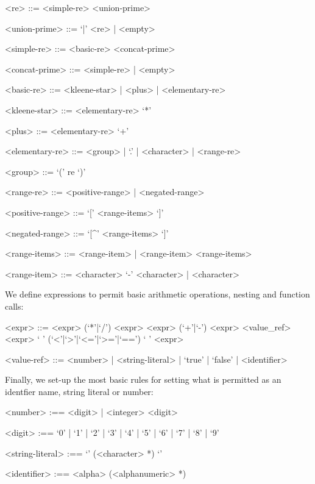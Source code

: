 \documentclass[a4paper,openany,12pt]{book}
\begin{document}
\begin{grammar}

    <re> ::= <simple-re> <union-prime>

    <union-prime> ::= `|' <re> | <empty>

    <simple-re> ::= <basic-re> <concat-prime>

    <concat-prime> ::= <simple-re> | <empty>

    <basic-re> ::= <kleene-star> | <plus> | <elementary-re>

    <kleene-star> ::= <elementary-re> `*'

    <plus> ::= <elementary-re> `+'

    <elementary-re> ::= <group> | `.' | <character> | <range-re>

    <group> ::= `(' re `)'

    <range-re> ::= <positive-range> | <negated-range>

    <positive-range> ::= `[' <range-items> `]'

    <negated-range> ::= `[^' <range-items> `]'

    <range-items> ::= <range-item> | <range-item> <range-items>

    <range-item> ::= <character> `-' <character> | <character>

\end{grammar}

We define expressions to permit basic arithmetic operations, nesting and function calls:

\begin{grammar}
<expr> ::= <expr> (`*'|`/') <expr>
    \alt <expr> (`+'|`-') <expr>
    \alt <value_ref>
    \alt <expr> ` ' (`<'|`>'|`<='|`>='|`==') ` ' <expr>

<value-ref> ::= <number> | <string-literal> | `true' | `false' | <identifier>
\end{grammar}

Finally, we set-up the most basic rules for setting what is permitted as an identfier name, string literal or
number:

\begin{grammar}
    <number> :== <digit> | <integer> <digit>

    <digit> :== `0' | `1' | `2' | `3' | `4' | `5' | `6' | `7' | `8' | `9'

    <string-literal> :== `\textquotedbl{}' (<character> *) `\textquotedbl{}'

    <identifier> :== <alpha> (<alphanumeric> *)
\end{grammar}
\end{document}
